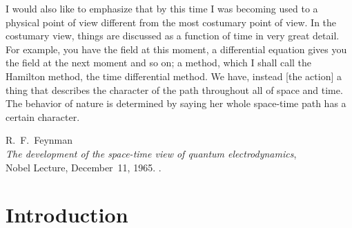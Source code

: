 


\label{chp:fundamentals} 


\begin{quoting}
   \openquote I would also like to emphasize that by this time I was becoming
   used to a physical point of view different from the most costumary point of
   view. In the costumary view, things are discussed as a function of time in
   very great detail.  For example, you have the field at this moment, a
   differential equation gives you the field at the next moment and so on; a
   method, which I shall call the Hamilton method, the time differential method.
   We have, instead [the action] a thing that describes the character of the
   path throughout all of space and time. The behavior of nature is determined
   by saying her whole space-time path has a certain character.~\closequote
   \begin{signature}
       R.~F.~Feynman \\
       \emph{The development of the space-time view of quantum 
	  electrodynamics}, \\
       Nobel Lecture, December~11, 1965.
       \textcite{Brown_ed:2000}.
    \end{signature}
\end{quoting}

\section{Introduction}

